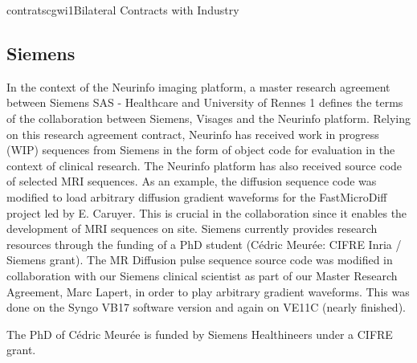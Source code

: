 \documentclass{ra2018}
\begin{document}
\begin{module}{contrats}{cgwi1}{Bilateral Contracts with Industry}

\subsection{Siemens}
In the context of the Neurinfo imaging platform, a master research agreement between Siemens SAS - Healthcare and University of Rennes 1 defines the terms of the collaboration between Siemens, Visages and the Neurinfo platform. Relying on
this research agreement contract, Neurinfo has received work in progress (WIP) sequences from Siemens in the form of object code for evaluation in the context of clinical research. The Neurinfo platform has also received source code of selected MRI sequences. As an example, the diffusion sequence code was modified to load arbitrary diffusion gradient waveforms for the FastMicroDiff project led by E. Caruyer. This is crucial in the collaboration since it enables the development of MRI sequences on site. Siemens currently provides research resources through the funding of a PhD student (Cédric Meurée: CIFRE Inria / Siemens grant). The MR Diffusion pulse sequence source code was modified in collaboration with our Siemens clinical scientist as part of our Master Research Agreement, Marc Lapert, in order to play arbitrary gradient waveforms. This was done on the Syngo VB17 software version and again on VE11C (nearly finished).

The PhD of Cédric Meurée is funded by Siemens Healthineers under a CIFRE grant. 

\end{module}
\end{document}
